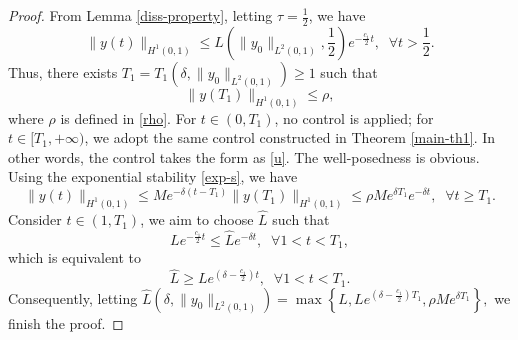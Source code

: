 \documentclass[10pt,a4paper]{amsart}
\begin{document}
\begin{proof}
    From {Lemma} \ref{diss-property}, letting $\tau=\frac{1}{2}$, we have
    \begin{equation*}
         \| y(t)\|_{H^1(0,1)}\le L\left(\|y_0\|_{L^2(0,1)},\frac{1}{2}\right)e^{-\frac{c_1 }{2}t},\;\;\forall t>\frac{1}{2}.
    \end{equation*}
    Thus, there exists ${T}_1={T}_1\left(\delta,\|y_0\|_{L^2(0,1)}\right)\ge1$ such that
    \begin{equation*}
        \|y(T_1)\|_{H^1(0,1)}\le \rho,
    \end{equation*}
where \(\rho\) is defined in \eqref{rho}. For $t\in (0,{T}_1)$, no control is applied; for $t\in [{T}_1,+\infty)$, we adopt the same control constructed in {Theorem} \ref{main-th1}. In other words, the control takes the form as \eqref{u}. The well-posedness is obvious. Using the exponential stability \eqref{exp-s}, we have
\begin{equation*}
    \|y(t)\|_{H^1(0,1)}\le {{M}}e^{-\delta(t-{T}_1)}\|y({T}_1)\|_{H^1(0,1)}\le \rho {{M}}e^{\delta {T}_1}e^{-\delta t},\;\; \forall t\ge {T}_1.
\end{equation*}
Consider $t\in (1,{T}_1)$, we aim to choose $\hat{L}$ such that
\begin{equation*}
    Le^{-\frac{c_1}{2}t}\le \hat{L}e^{-\delta t},\;\;\forall 1<t<{T}_1,
\end{equation*}
which is equivalent to
\begin{equation*}
    \hat{L}\ge Le^{(\delta-\frac{c_1}{2})t},\;\;\forall 1<t<{T}_1.
\end{equation*}
Consequently, letting $\hat{L}\left(\delta,\|y_0\|_{L^2(0,1)}\right)=\max\left\{L,Le^{(\delta-\frac{c_1}{2}){T}_1},\rho {{M}}e^{\delta {T}_1}\right\},$ we finish the proof.
\end{proof}
\end{document}
